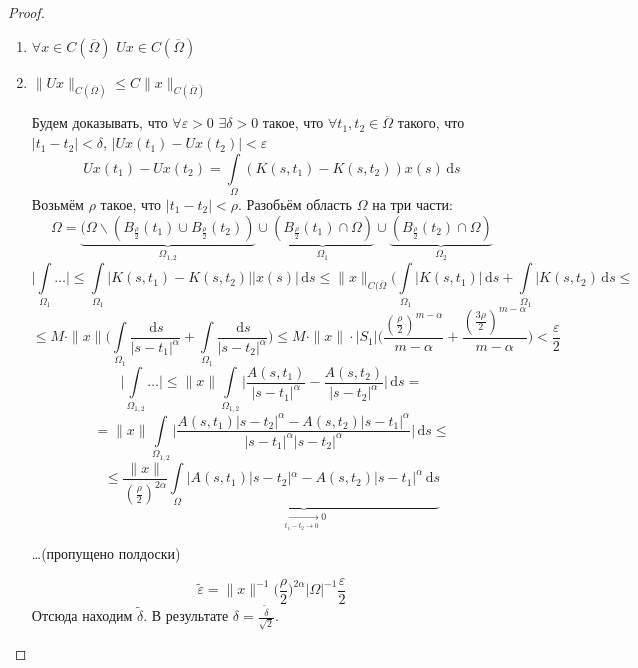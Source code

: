 \documentclass[11pt,openany,a4paper]{scrartcl}
\theoremstyle{plain}
\theoremstyle{definition}
\newcommand{\underto}[1]{\xrightarrow[#1]{}}
\newcommand{\dif}{\, \mathrm d}
\begin{document}
\begin{proof}
    \begin{enumerate}
        \item $\forall x \in C(\overline\Omega)$
        $Ux \in C(\overline\Omega)$
        \item $\|Ux\|_{C(\overline\Omega)} \leqslant C \|x\|_{C(\overline\Omega)}$
        
        Будем доказывать, что $\forall \varepsilon > 0$ $\exists \delta > 0$
        такое, что $\forall t_1, t_2 \in \overline\Omega$ такого, что
        $|t_1 - t_2| < \delta$, $|Ux(t_1) - Ux(t_2)| < \varepsilon$
        $$
        Ux(t_1) - Ux(t_2) = \int\limits_\Omega(K(s, t_1) - K(s, t_2))x(s)\dif s
        $$
        Возьмём $\rho$ такое, что $|t_1 - t_2| < \rho$.
        Разобьём область $\Omega$ на три части:
        $$
        \Omega = \underbrace{(\Omega \backslash (B_{\frac{\rho}{2}}(t_1)
        \cup B_{\frac{\rho}{2}}(t_2))}_{\Omega_{1,2}}
        \cup \underbrace{(B_{\frac{\rho}{2}}(t_1) \cap \Omega)}_{\Omega_1} \cup
        \underbrace{(B_{\frac{\rho}{2}}(t_2) \cap \Omega)}_{\Omega_2}
        $$
        $$
        \bigg|\int\limits_{\Omega_1}\ldots\bigg| \leqslant
        \int\limits_{\Omega_1} |K(s, t_1) - K(s, t_2)||x(s)|\dif s \leqslant
        \|x\|_{C(\overline\Omega}\bigg(\int\limits_{\Omega_1}|K(s, t_1)|\dif s +
        \int\limits_{\Omega_1}|K(s, t_2)\dif s \leqslant
        $$
        $$
        \leqslant M \cdot \|x\|\bigg(\int\limits_{\Omega_1}
        \frac{\dif s}{|s - t_1|^\alpha} + \int\limits_{\Omega_1}
        \frac{\dif s}{|s - t_2|^\alpha}\bigg) \leqslant
        M \cdot \|x\|\cdot |S_1|
        \bigg(\frac{(\frac{\rho}{2})^{m - \alpha}}{m - \alpha} +
        \frac{(\frac{3\rho}{2})^{m - \alpha}}{m - \alpha}\bigg) < 
        \frac{\varepsilon}{2}
        $$
        $$
        \bigg|\int\limits_{\Omega_{1,2}}\ldots\bigg| \leqslant
        \|x\| \int\limits_{\Omega_{1,2}}\bigg|\frac{A(s, t_1)}{|s - t_1|^\alpha} -
        \frac{A(s, t_2)}{|s - t_2|^\alpha}\bigg|\dif s =
        $$
        $$
        = \|x\| \int\limits_{\Omega_{1,2}} \bigg|
        \frac{A(s, t_1)|s - t_2|^\alpha - A(s, t_2)|s - t_1|^\alpha}
        {|s - t_1|^\alpha|s - t_2|^\alpha}\bigg| \dif s \leqslant
        $$
        $$
        \leqslant
        \frac{\|x\|}{(\frac{\rho}{2})^{2\alpha}}
        \underbrace{\int\limits_\Omega |A(s, t_1)|s - t_2|^\alpha -
        A(s, t_2)|s - t_1|^\alpha \dif s}_{\underto{t_1 - t_2 \to 0} 0}
        $$
        
        \ldots (пропущено полдоски)
        
        $$
        \widetilde\varepsilon = \|x\|^{-1}\Big(\frac{\rho}{2}\Big)^{2\alpha}
        |\Omega|^{-1}
        \frac{\varepsilon}{2}
        $$
        Отсюда находим $\widetilde\delta$.
        В результате $\delta = \frac{\widetilde\delta}{\sqrt{2}}$.
    \end{enumerate}
\end{proof}
\end{document}
